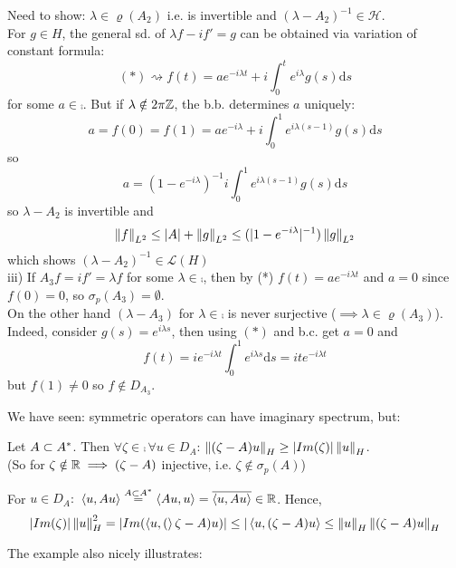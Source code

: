 \documentclass{article}
\begin{document}
\begin{example}
\begin{pf}{}{}
		Need to show: $\lambda\in\varrho(A_2)$ i.e.  is invertible and $(\lambda-A_2)^{-1}\in\mathcal{H}$.\\
		For $g\in H$, the general sd. of $\lambda f-if'=g$ can be obtained via variation of constant formula:
		$$
			(*)\rightsquigarrow f(t)=ae^{-i\lambda t}+i \int_0^t e^{i\lambda}g(s)\mathrm{d}s
		$$
		for some $a\in\comp$. But if $\lambda\notin2\pi\mathbb{Z}$, the b.b. determines $a$ uniquely:
		$$
			a=f(0)=f(1)=ae^{-i\lambda}+i\int_0^1e^{i\lambda(s-1)}g(s)\mathrm{d}s$$
		so
		$$
			a=(1-e^{-i\lambda})^{-1}i\int_0^1e^{i\lambda(s-1)}g(s)\mathrm{d}s
		$$
		so $\lambda-A_2$ is invertible and
		$$
        \left\|{f}\right\|_{L^2}\leq |A|+\left\|{g}\right\|_{L^2}\leq(|1-e^{-i\lambda}|^{-1})\left\|{g}\right\|_{L^2}
        $$
		which shows $(\lambda-A_2)^{-1}\in\mathcal{L}(H)$\\
		iii) If $A_3f=if'=\lambda f$ for some $\lambda\in\comp$, then by (*) $f(t)=ae^{-i\lambda t}$ and $a=0$ since $f(0)=0$, so $\sigma_p(A_3)=\emptyset$.\\
		On the other hand $(\lambda-A_3)$ for $\lambda\in\comp$ is never surjective ($\implies \lambda\in\varrho(A_3)$). Indeed, consider $g(s)=e^{i\lambda s}$, then using $(*)$ and b.c. get $a=0$ and
		$$
        f(t)=ie^{-i\lambda t}\int_0^1e^{i\lambda s} \mathrm{d}s=ite^{-i\lambda t}
        $$
		but $f(1)\neq0$ so $f\notin D_{A_3}$.
	\end{pf}
\end{example}
We have seen: symmetric operators can have imaginary spectrum, but:
\begin{lemma}
	Let $A\subset {A}^*$. Then $\forall\zeta\in\comp\,\forall u\in D_A$: $\left\|{(\zeta-A)u}\right\|_H\geq |Im(\zeta)|\left\|{u}\right\|_H$.\\
	(So for $\zeta\notin\mathbb{R}\implies(\zeta-A)$ injective, i.e. $\zeta\notin\sigma_p(A)$)
	\begin{pf}{}{}
		For $u\in D_A:$ $\left<{u},{Au}\right>\stackrel{A\subset{A}^*}{=}\left<{Au},{u}\right>=\overline{\left<{u},{Au}\right>}\in\mathbb{R}$. Hence,
		$$
			|Im(\zeta)|\left\|{u}\right\|^2_H=|Im(\left<{u},{(}\right>\zeta-A)u)|\leq|\left<{u},{(\zeta-A)u}\right>\leq\left\|{u}\right\|_H\left\|{(\zeta-A)u}\right\|_H
		$$
	\end{pf}
\end{lemma}
The example also nicely illustrates:
\end{document}
